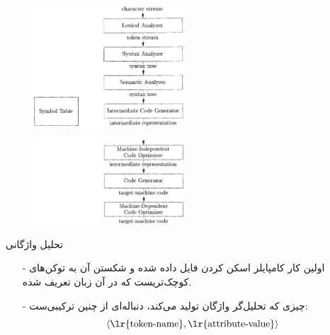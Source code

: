 \begin{frame}{}
\begin{figure}[H]
\begin{center}
\includegraphics[width=0.5\textwidth, height=0.8\textheight, angle=-0.5]{docs/images/front}
\end{center}
\end{figure}
\end{frame}

\begin{frame}{}
\begin{figure}[H]
\begin{center}
\includegraphics[width=0.5\textwidth, height=0.6\textheight, angle=-0.5]{docs/images/back}
\end{center}
\end{figure}
\end{frame}

\begin{frame}{تحلیل واژگانی }
\begin{itemize}\itemr
\item[-]
اولین کار کامپایلر اسکن کردن فایل داده شده و شکستن آن به توکن‌های کوچک‌تریست که در آن زبان تعریف شده.

\item[-]
چیزی که تحلیل‌گر واژگان تولید می‌کند، دنباله‌ای از چنین ترکیبی‌ست:
\begin{equation*}
\left\langle\text{\lr{token-name}}, \text{\lr{attribute-value}}\right\rangle 
\end{equation*}
\end{itemize}
\end{frame}

